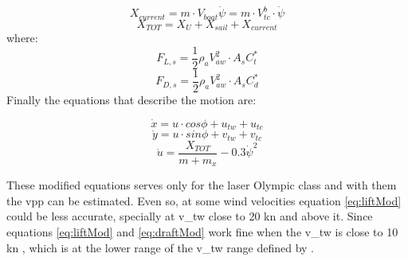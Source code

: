 \begin{equation}\label{eq:Forces_M} 
     X_{current}=m\cdot V_{boat} \Dot{\psi}= m\cdot V_{tc}^b \cdot \Dot{\psi}
\end{equation}
\begin{equation}\label{eq:X_TOTM}
    X_{TOT}=X_{U}+X_{sail}+X_{current}
\end{equation}
where:
\begin{equation} \label{eq:SailLiftM}
    F_{L,s}=\frac{1}{2}\rho_{a}V_{aw}^2 \cdot A_{s} C_{t}^*
\end{equation}
\begin{equation} \label{eq:SailDragM}
    F_{D,s}=\frac{1}{2}\rho_{a}V_{aw}^2 \cdot A_{s} C_{d}^*
\end{equation}
Finally the equations that describe the motion are:\par
\begin{equation}\label{eq:x_dotM}
\Dot{x}=u \cdot cos\phi + u_{tw} + u_{tc}
\end{equation}
\begin{equation}\label{eq:y_dotM}
\Dot{y}=u \cdot sin\phi + v_{tw} + v_{tc}
\end{equation}
\begin{equation} \label{eq:u_dotLaserMR}
    \Dot{u}=\frac{X_{TOT}}{m+m_{x}}- 0.3 \Dot{\psi}^2
\end{equation}

These modified equations serves only for the laser Olympic class and with them the \acrshort{vpp} can be estimated. Even so, at some wind velocities  %
equation \ref{eq:liftMod} %
could be less accurate, specially at \acrshort{v_tw} close to 20 kn and above it. Since equations \ref{eq:liftMod} and \ref{eq:draftMod} work fine when the \acrshort{v_tw} is close to 10 kn \cite{day2017performance}, which is at the lower range of the \acrshort{v_tw} range defined by \cite{laser_opt}. \par 

